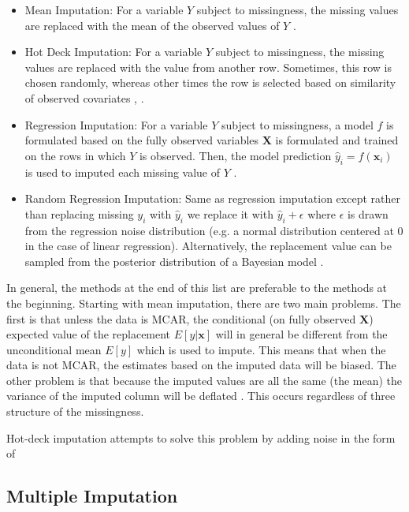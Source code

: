 \documentclass[12pt,twoside]{reedthesis}
\theoremstyle{definition}
\begin{document}
\begin{itemize}
\item Mean Imputation: For a variable $Y$ subject to missingness, the missing values are replaced with the mean of the observed values of $Y$ \citep{Little_1986}.

\item Hot Deck Imputation: For a variable $Y$ subject to missingness, the missing values are replaced with the value from another row. Sometimes, this row is chosen randomly, whereas other times the row is selected based on similarity of observed covariates \citep{Little_1986}, \citep{Schafer_2002}.

\item Regression Imputation: For a variable $Y$ subject to missingness, a model $f$ is formulated based on the fully observed variables $\mathbf{X}$ is formulated and trained on the rows in which $Y$ is observed. Then, the model prediction $\hat y_i = f(\mathbf{x}_i)$ is used to imputed each missing value of $Y$ \citep{Schafer_2002}.

\item Random Regression Imputation: Same as regression imputation except rather than replacing missing $y_i$ with $\hat y_i$ we replace it with $\hat y_i + \epsilon$ where $\epsilon$ is drawn from the regression noise distribution (e.g. a normal distribution centered at $0$ in the case of linear regression). Alternatively, the replacement value can be sampled from the posterior distribution of a Bayesian model \citep{Rubin_1996}.
\end{itemize}

In general, the methods at the end of this list are preferable to the methods at the beginning. Starting with mean imputation, there are two main problems. The first is that unless the data is MCAR, the conditional (on fully observed $\mathbf{X}$) expected value  of the replacement $E[y| \mathbf{x}]$ will in general be different from the unconditional mean $E[y]$ which is used to impute. This means that when the data is not MCAR, the estimates based on the imputed data will be biased. The other problem is that because the imputed values are all the same (the mean) the variance of the imputed column will be deflated \citep{Gelman_2006}. This occurs regardless of three structure of the missingness.

Hot-deck imputation attempts to solve this problem by adding noise in the form of 

\subsection{Multiple Imputation}
\end{document}
